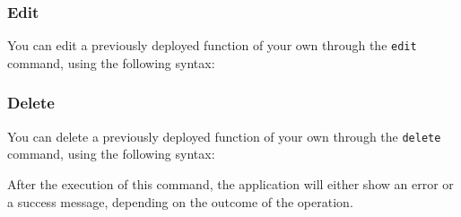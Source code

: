 \subsubsection{Edit}
You can edit a previously deployed function of your own through the \texttt{edit} command, using the following syntax:
\begin{center}
\end{center}

\subsubsection{Delete}
You can delete a previously deployed function of your own through the \texttt{delete} command, using the following syntax:
\begin{center}
\end{center}
After the execution of this command, the application will either show an error or a success message, depending on the outcome of the operation.